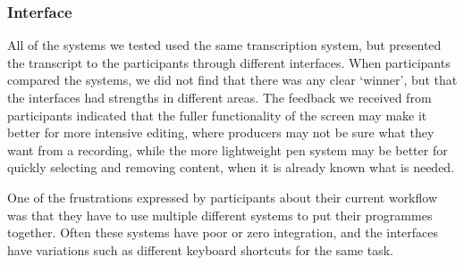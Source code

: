 




\subsubsection{Interface}

All of the systems we tested used the same transcription system, but presented the transcript to the participants
through different interfaces. When participants compared the systems, we did not find that there was any clear
`winner', but that the interfaces had strengths in different areas. The feedback we received from participants
indicated that the fuller functionality of the screen may make it better for more intensive editing, where producers
may not be sure what they want from a recording, while the more lightweight pen system may be better for quickly
selecting and removing content, when it is already known what is needed.

One of the frustrations expressed by participants about their current workflow was that they have to use multiple
different systems to put their programmes together. Often these systems have poor or zero integration, and the
interfaces have variations such as different keyboard shortcuts for the same task.

